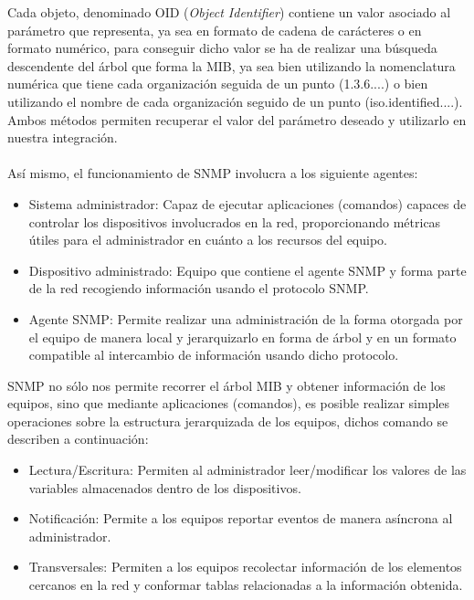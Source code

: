 Cada objeto, denominado OID (\textit{Object Identifier}) contiene un valor asociado al parámetro que representa, ya sea en formato de cadena de carácteres o en formato numérico, para conseguir dicho valor se ha de realizar una búsqueda descendente del árbol que forma la MIB, ya sea bien utilizando la nomenclatura numérica que tiene cada organización seguida de un punto (1.3.6....) o bien utilizando el nombre de cada organización seguido de un punto (iso.identified....). Ambos métodos permiten recuperar el valor del parámetro deseado y utilizarlo en nuestra integración.\\\\

Así mismo, el funcionamiento de SNMP involucra a los siguiente agentes:

\begin{itemize}
	\item Sistema administrador: Capaz de ejecutar aplicaciones (comandos) capaces de controlar los dispositivos involucrados en la red, proporcionando métricas útiles para el administrador en cuánto a los recursos del equipo.
	\item Dispositivo administrado: Equipo que contiene el agente SNMP y forma parte de la red recogiendo información usando el protocolo SNMP.
	\item Agente SNMP: Permite realizar una administración de la forma otorgada por el equipo de manera local y jerarquizarlo en forma de árbol y en un formato compatible al intercambio de información usando dicho protocolo.
\end{itemize}

SNMP no sólo nos permite recorrer el árbol MIB y obtener información de los equipos, sino que mediante aplicaciones (comandos), es posible realizar simples operaciones sobre la estructura jerarquizada de los equipos, dichos comando se describen a continuación:

\begin{itemize}
	\item Lectura/Escritura: Permiten al administrador leer/modificar los valores de las variables almacenados dentro de los dispositivos.
	\item Notificación: Permite a los equipos reportar eventos de manera asíncrona al administrador. 
	\item Transversales: Permiten a los equipos recolectar información de los elementos cercanos en la red y conformar tablas relacionadas a la información obtenida. 
\end{itemize}

